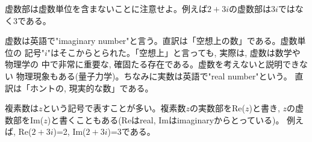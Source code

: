 虚数部は虚数単位を含まないことに注意せよ。例えば$2+3i$の虚数部は$3i$ではなく3である。

虚数は英語で"imaginary number"と言う。直訳は「空想上の数」である。虚数単位の
記号"$i$"はそこからとられた。「空想上」と言っても, 実際は, 虚数は数学や物理学の
中で非常に重要な, 確固たる存在である。虚数を考えないと説明できない
物理現象もある(量子力学)。ちなみに実数は英語で"real number"という。
直訳は「ホントの, 現実的な数」である。

複素数は$z$という記号で表すことが多い。複素数$z$の実数部をRe($z$)と書き, 
$z$の虚数部をIm($z$)と書くこともある(Reはreal, Imはimaginaryからとっている)。
例えば, Re($2+3i$)=2, Im($2+3i$)=3である。







